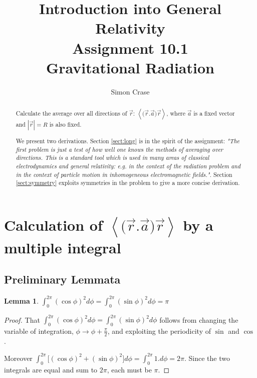 \documentclass[]{article}
\title{Introduction into General Relativity\\Assignment 10.1\\Gravitational Radiation}
\author{Simon Crase}
\newtheorem{lemma}{Lemma}
\begin{document}
\maketitle

\begin{abstract}
	
	Calculate the average over all directions of $\vec{r}$: $\left\langle \big(\vec{r}.\vec{a}\big)\vec{r} \right\rangle$, where $\vec{a}$ is a fixed vector and $|\vec{r}|=R$ is also fixed.
	
	We present two derivations. Section \ref{sect:long} is in the spirit of the assignment: \emph{"The first problem is just a test of how well one knows the methods of averaging over directions. This is a standard tool which is used in many areas of classical electrodynamics and general relativity: e.g. in the context of the radiation problem and in the context of particle motion in inhomogeneous electromagnetic fields."}. Section \ref{sect:symmetry} exploits symmetries in the problem to give a more concise derivation.
\end{abstract}

\tableofcontents

\section{Calculation of $\left\langle \big(\vec{r}.\vec{a}\big)\vec{r} \right\rangle$ by a multiple integral}\label{sect:long}
\subsection{Preliminary Lemmata}
\begin{lemma}\label{lemma:i1}
	$\int_{0}^{2\pi}(\cos\phi)^2  d\phi = \int_{0}^{2\pi}(\sin\phi)^2  d\phi=\pi$
\end{lemma}
\begin{proof}
	That $\int_{0}^{2\pi}(\cos\phi)^2  d\phi = \int_{0}^{2\pi}(\sin\phi)^2  d\phi$ follows from changing the variable of integration, $\phi\rightarrow\phi+\frac{\pi}{2}$, and exploiting the periodicity of $\sin$ and $\cos$. 
	
	Moreover $\int_{0}^{2\pi}\big[(\cos\phi)^2  +(\sin\phi)^2\big] d\phi=\int_{0}^{2\pi}1. d\phi=2\pi$. Since the two integrals are equal and sum to $2\pi$, each must be $\pi$.
\end{proof}
\end{document}
